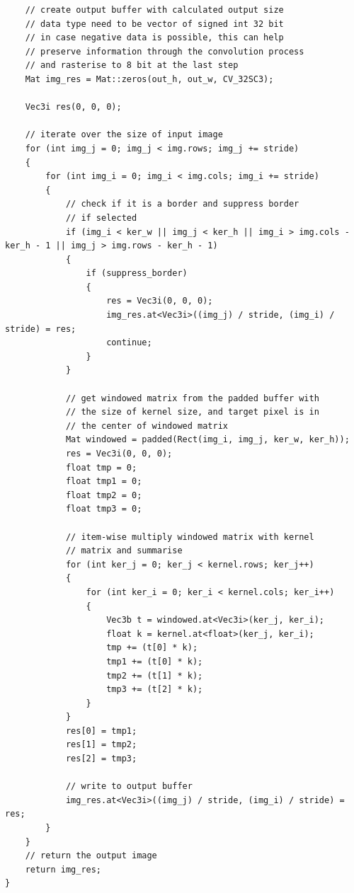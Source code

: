 \documentclass[12pt,a4paper]{report}
\begin{document}
\begin{lstlisting}
    // create output buffer with calculated output size
    // data type need to be vector of signed int 32 bit
    // in case negative data is possible, this can help
    // preserve information through the convolution process
    // and rasterise to 8 bit at the last step
    Mat img_res = Mat::zeros(out_h, out_w, CV_32SC3);

    Vec3i res(0, 0, 0);

    // iterate over the size of input image
    for (int img_j = 0; img_j < img.rows; img_j += stride)
    {
        for (int img_i = 0; img_i < img.cols; img_i += stride)
        {
            // check if it is a border and suppress border
            // if selected
            if (img_i < ker_w || img_j < ker_h || img_i > img.cols - ker_h - 1 || img_j > img.rows - ker_h - 1)
            {
                if (suppress_border)
                {
                    res = Vec3i(0, 0, 0);
                    img_res.at<Vec3i>((img_j) / stride, (img_i) / stride) = res;
                    continue;
                }
            }

            // get windowed matrix from the padded buffer with
            // the size of kernel size, and target pixel is in
            // the center of windowed matrix
            Mat windowed = padded(Rect(img_i, img_j, ker_w, ker_h));
            res = Vec3i(0, 0, 0);
            float tmp = 0;
            float tmp1 = 0;
            float tmp2 = 0;
            float tmp3 = 0;

            // item-wise multiply windowed matrix with kernel
            // matrix and summarise
            for (int ker_j = 0; ker_j < kernel.rows; ker_j++)
            {
                for (int ker_i = 0; ker_i < kernel.cols; ker_i++)
                {
                    Vec3b t = windowed.at<Vec3i>(ker_j, ker_i);
                    float k = kernel.at<float>(ker_j, ker_i);
                    tmp += (t[0] * k);
                    tmp1 += (t[0] * k);
                    tmp2 += (t[1] * k);
                    tmp3 += (t[2] * k);
                }
            }
            res[0] = tmp1;
            res[1] = tmp2;
            res[2] = tmp3;

            // write to output buffer
            img_res.at<Vec3i>((img_j) / stride, (img_i) / stride) = res;
        }
    }
    // return the output image
    return img_res;
}
\end{lstlisting}
\end{document}
